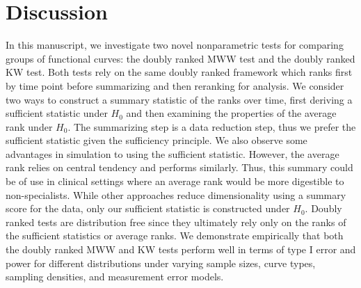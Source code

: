 \documentclass[12pt]{article}
\theoremstyle{plain}
\theoremstyle{remark}
\begin{document}


	\section{Discussion}
	\label{s:disc}
	
	In this manuscript, we investigate two novel nonparametric tests for comparing groups of functional curves: the doubly ranked MWW test and the doubly ranked KW test. Both tests rely on the same doubly ranked framework which ranks first by time point before summarizing and then reranking for analysis. We consider two ways to construct a summary statistic of the ranks over time, first deriving a sufficient statistic under $H_0$ and then examining the properties of the average rank under $H_0$. The summarizing step is a data reduction step, thus we prefer the sufficient statistic given the sufficiency principle. We also observe some advantages in simulation to using the sufficient statistic. However, the average rank relies on central tendency and performs similarly. Thus, this summary could be of use in clinical settings where an average rank would be more digestible to non-specialists.
	While other approaches reduce dimensionality using a summary score for the data, only our sufficient statistic is constructed under $H_0$. Doubly ranked tests are distribution free since they ultimately rely only on the ranks of the sufficient statistics or average ranks. We demonstrate empirically that both the doubly ranked MWW and KW tests perform well in terms of type I error and power for different distributions under varying sample sizes, curve types, sampling densities, and measurement error models.
	
\end{document}
